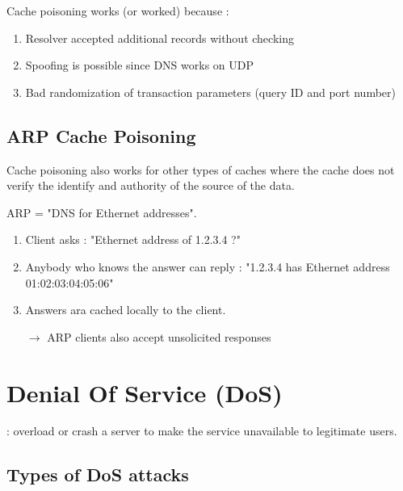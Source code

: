 Cache poisoning works (or worked) because :
\begin{enumerate}
    \item Resolver accepted additional records without checking
    \item Spoofing is possible since DNS works on UDP
    \item Bad randomization of transaction parameters (query ID and port number)
\end{enumerate}

\section{ARP Cache Poisoning}

Cache poisoning also works for other types of caches where the cache does not verify the identify and authority of the source of the data.

ARP = "DNS for Ethernet addresses".
\begin{enumerate}
    \item Client asks : "Ethernet address of 1.2.3.4 ?"
    \item Anybody who knows the answer can reply : "1.2.3.4 has Ethernet address 01:02:03:04:05:06"
    \item Answers ara cached locally to the client.
    \item[$\rightarrow$] ARP clients also accept unsolicited responses
\end{enumerate}

\chapter{Denial Of Service (DoS)}

 : overload or crash a server to make the service unavailable to legitimate users.

\section{Types of DoS attacks}

